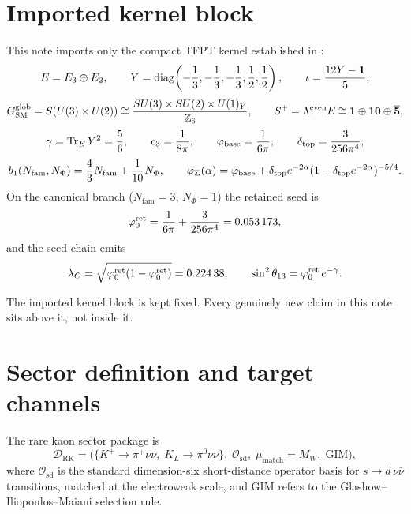 \section{Imported kernel block}
\label{sec:kernel}

This note imports only the compact TFPT kernel established in \cite{TFPT}:
\[
E = E_3\oplus E_2,
\qquad
Y=\mathrm{diag}\!\left(-\frac13,-\frac13,-\frac13,\frac12,\frac12\right),
\qquad
\iota = \frac{12Y-\mathbf 1}{5},
\]
\[
G_{\mathrm{SM}}^{\mathrm{glob}}
=
S(U(3)\times U(2))
\cong
\frac{SU(3)\times SU(2)\times U(1)_Y}{\mathbb Z_6},
\qquad
S^+ = \Lambda^{\mathrm{even}}E \cong \mathbf 1\oplus\mathbf{10}\oplus\overline{\mathbf 5},
\]
\[
\gamma=\operatorname{Tr}_EY^2=\frac56,
\qquad
c_3=\frac1{8\pi},
\qquad
\varphi_{\mathrm{base}}=\frac1{6\pi},
\qquad
\delta_{\mathrm{top}}=\frac{3}{256\pi^4},
\]
\[
b_1(N_{\mathrm{fam}},N_\Phi)=\frac43N_{\mathrm{fam}}+\frac1{10}N_\Phi,
\qquad
\varphi_{\Sigma}(\alpha)=\varphi_{\mathrm{base}}+\delta_{\mathrm{top}} e^{-2\alpha}(1-\delta_{\mathrm{top}} e^{-2\alpha})^{-5/4}.
\]
On the canonical branch ($N_{\mathrm{fam}}=3$, $N_\Phi=1$) the retained seed is
\begin{equation}
\label{eq:retained-seed}
\varphi_{0}^{\mathrm{ret}}=\frac{1}{6\pi}+\frac{3}{256\pi^4}=\num{0.053173},
\end{equation}
and the seed chain emits
\begin{equation}
\label{eq:seed-chain}
\lambda_C=\sqrt{\varphi_{0}^{\mathrm{ret}}(1-\varphi_{0}^{\mathrm{ret}})}=\num{0.22438},
\qquad
\sin^2\theta_{13}=\varphi_{0}^{\mathrm{ret}}\, e^{-\gamma}.
\end{equation}

\begin{remark}
The imported kernel block is kept fixed.
Every genuinely new claim in this note sits above it, not inside it.
\end{remark}


\section{Sector definition and target channels}
\label{sec:sector}

\begin{definition}
\label{def:sector-data}
The rare kaon sector package is
\[
\mathcal D_{\mathrm{RK}}
=
\bigl(
\{K^+\!\to\pi^+\nu\bar\nu,\; K_L\to\pi^0\nu\bar\nu\},\;
\mathcal O_{\mathrm{sd}},\;
\mu_{\mathrm{match}}=M_W,\;
\text{GIM}\bigr),
\]
where $\mathcal O_{\mathrm{sd}}$ is the standard dimension-six short-distance operator
basis for $s\to d\,\nu\bar\nu$ transitions, matched at the electroweak scale, and GIM
refers to the Glashow--Iliopoulos--Maiani selection rule.
\end{definition}

